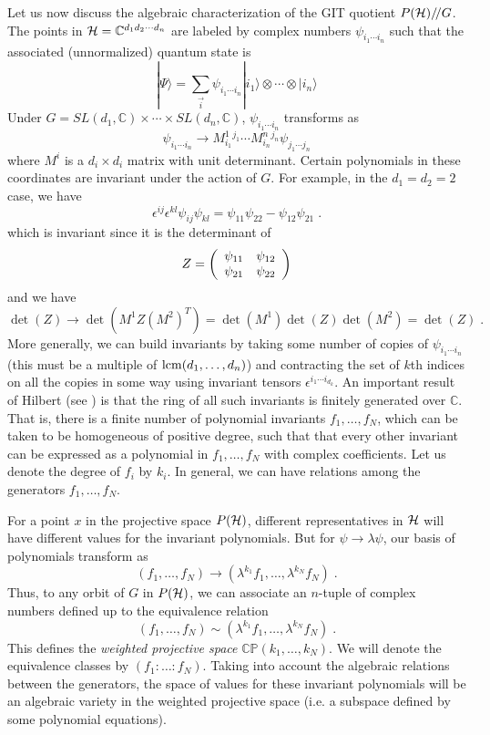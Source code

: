 \documentclass[12pt]{article}
\theoremstyle{definition}
\newcommand{\be}{\begin{equation}}
\newcommand{\ee}{\end{equation}}
\newcommand{\ba}{\begin{array}}
\newcommand{\ea}{\end{array}}
\newcommand{\GITquot}{/\!/}
\begin{document}
Let us now discuss the algebraic characterization of the GIT quotient $P({\cal H})\GITquot G$. The points in ${\cal H} = \mathbb{C}^{d_1 d_2 \cdots d_n}$ are labeled by complex numbers $\psi_{i_{1} \cdots i_n}$ such that the associated (unnormalized) quantum state is
\be
|\Psi \rangle = \sum_{\vec{i}} \psi_{i_1 \cdots i_n} |i_1 \rangle  \otimes \cdots  \otimes |i_n \rangle
\ee
Under $G = SL(d_1,\mathbb{C}) \times \cdots \times SL(d_n,\mathbb{C})$, $\psi_{i_{1} \cdots i_n}$ transforms as
\be
\psi_{i_1 \cdots i_n} \to M^1_{i_1} {}^{j_1} \cdots M^n_{i_n} {}^{j_n} \psi_{j_1 \cdots j_n}
\ee
where $M^i$ is a $d_i \times d_i$ matrix with unit determinant. Certain polynomials in these coordinates are invariant under the action of $G$. For example, in the $d_1 = d_2 = 2$ case, we have
\be
\epsilon^{ij} \epsilon^{kl} \psi_{ij} \psi_{kl} = \psi_{11} \psi_{22} - \psi_{12} \psi_{21} \; .
\ee
which is invariant since it is the determinant of
\be
Z = \left( \ba{cc} \psi_{11} & \psi_{12} \cr \psi_{21} & \psi_{22} \ea \right)
\ee
and we have
\be
\det(Z) \to \det(M^1 Z (M^2)^T) = \det(M^1) \det(Z) \det(M^2) = \det(Z) \; .
\ee
More generally, we can build invariants by taking some number  of copies of $\psi_{i_1 \cdots i_n}$ (this must be a multiple of ${\rm lcm}(d_1, \dots, d_n)$) and contracting the set of $k$th indices on all the copies in some way using invariant tensors $\epsilon^{i_1 \cdots i_{d_k}}$. An important result of Hilbert (see \cite{mfk,dc}) is that the ring of all such invariants is finitely generated over $\mathbb C$. That is, there is a finite number of polynomial invariants $f_1, \dots, f_N$, which can be taken to be homogeneous of positive degree, such that that every other invariant can be expressed as a polynomial in $f_1, \dots, f_N$ with complex coefficients. Let us denote the degree of $f_i$ by $k_i$. In general, we can have relations among the generators $f_1, \dots, f_N$.

For a point $x$ in the projective space $P({\cal H})$, different representatives in ${\cal H}$ will have different values for the invariant polynomials. But for $\psi \to \lambda \psi$, our basis of polynomials transform as
\be
(f_1,\dots,f_N) \to  (\lambda^{k_1} f_1,\dots, \lambda^{k_N} f_N) \; .
\ee
Thus, to any orbit of $G$ in $P({\cal H})$, we can associate an $n$-tuple of complex numbers defined up to the equivalence relation
\be
(f_1,\dots,f_N) \sim  (\lambda^{k_1} f_1,\dots, \lambda^{k_N} f_N) \; .
\ee
This defines the {\it  weighted projective space} $\mathbb{C P}(k_1,\dots,k_N)$. We will denote the equivalence classes by $(f_1:\dots:f_N)$. Taking into account the algebraic relations between the generators, the space of values for these invariant polynomials will be an algebraic variety in the weighted projective space (i.e. a subspace defined by some polynomial equations).
\end{document}
